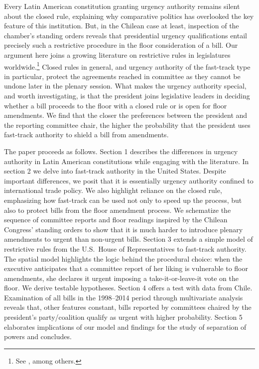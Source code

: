 \documentclass[letter,12pt]{article}
\begin{document}
Every Latin American constitution granting urgency authority remains silent about the closed rule, explaining why comparative politics has overlooked the key feature of this institution. But, in the Chilean case at least, inspection of the chamber's standing orders reveals that presidential urgency qualifications entail precisely such a restrictive procedure in the floor consideration of a bill. Our argument here joins a growing literature on restrictive rules in legislatures worldwide.\footnote{See \citet{dion.huber.1996,doring.restrictiveRules.2003,huber.1996b,krehbielRestrictiveRules1997,heller.2001,weingast.1992,schickler.richRules1997,cox.mccubbins.1997,amorim.cox.mccubbins.2003,calvo.2014argBook,sin.2014,denhartog.2004phd}, among others.} Closed rules in general, and urgency authority of the fast-track type in particular, protect the agreements reached in committee as they cannot be undone later in the plenary session. What makes the urgency authority special, and worth investigating, is that the president joins legislative leaders in deciding whether a bill proceeds to the floor with a closed rule or is open for floor amendments. We find that the closer the preferences between the president and the reporting committee chair, the higher the probability that the president uses fast-track authority to shield a bill from amendments. 

The paper proceeds as follows. Section 1 describes the differences in urgency authority in Latin American constitutions while engaging with the literature. In section 2 we delve into fast-track authority in the United States. Despite important differences, we posit that it is essentially urgency authority confined to international trade policy. We also highlight reliance on the closed rule, emphasizing how fast-track can be used not only to speed up the process, but also to protect bills from the floor amendment process. We schematize the sequence of committee reports and floor readings inspired by the Chilean Congress' standing orders to show that it is much harder to introduce plenary amendments to urgent than non-urgent bills. Section 3 extends a simple model of restrictive rules from the U.S.\ House of Representatives to fast-track authority. The spatial model highlights the logic behind the procedural choice: when the executive anticipates that a committee report of her liking is vulnerable to floor amendments, she declares it urgent imposing a take-it-or-leave-it vote on the floor. We derive testable hypotheses. Section 4 offers a test with data from Chile. Examination of all bills in the 1998--2014 period through multivariate analysis reveals that, other features constant, bills reported by committees chaired by the president's party/coalition qualify as urgent with higher probability. Section 5 elaborates implications of our model and findings for the study of separation of powers and concludes. 
\end{document}
